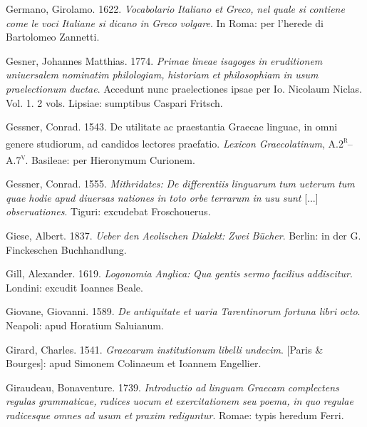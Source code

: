 Germano, Girolamo. 1622. \textit{Vocabolario} \textit{Italiano} \textit{et} \textit{Greco,} \textit{nel} \textit{quale} \textit{si} \textit{contiene} \textit{come} \textit{le} \textit{voci} \textit{Italiane} \textit{si} \textit{dicano} \textit{in} \textit{Greco} \textit{volgare}. In Roma: per l’herede di Bartolomeo Zannetti.

Gesner, Johannes Matthias. 1774. \textit{Primae} \textit{lineae} \textit{isagoges} \textit{in} \textit{eruditionem} \textit{uniuersalem} \textit{nominatim} \textit{philologiam,} \textit{historiam} \textit{et} \textit{philosophiam} \textit{in} \textit{usum} \textit{praelectionum} \textit{ductae}. Accedunt nunc praelectiones ipsae per Io. Nicolaum Niclas. Vol. 1. 2 vols. Lipsiae: sumptibus Caspari Fritsch.

Gessner, Conrad. 1543. De utilitate ac praestantia Graecae linguae, in omni genere studiorum, ad candidos lectores praefatio. \textit{Lexicon} \textit{Graecolatinum}, A.2\textsc{\textsuperscript{r}}–A.7\textsc{\textsuperscript{v}}. Basileae: per Hieronymum Curionem.

Gessner, Conrad. 1555. \textit{Mithridates:} \textit{De} \textit{differentiis} \textit{linguarum} \textit{tum} \textit{ueterum} \textit{tum} \textit{quae} \textit{hodie} \textit{apud} \textit{diuersas} \textit{nationes} \textit{in} \textit{toto} \textit{orbe} \textit{terrarum} \textit{in} \textit{usu} \textit{sunt} [...] \textit{obseruationes}. Tiguri: excudebat Froschouerus.

Giese, Albert. 1837. \textit{Ueber} \textit{den} \textit{Aeolischen} \textit{Dialekt:} \textit{Zwei} \textit{Bücher}. Berlin: in der G. Finckeschen Buchhandlung.

Gill, Alexander. 1619. \textit{Logonomia} \textit{Anglica:} \textit{Qua} \textit{gentis} \textit{sermo} \textit{facilius} \textit{addiscitur}. Londini: excudit Ioannes Beale.

Giovane, Giovanni. 1589. \textit{De} \textit{antiquitate} \textit{et} \textit{uaria} \textit{Tarentinorum} \textit{fortuna} \textit{libri} \textit{octo}. Neapoli: apud Horatium Saluianum.

Girard, Charles. 1541. \textit{Graecarum} \textit{institutionum} \textit{libelli} \textit{undecim}. [Paris \& Bourges]: apud Simonem Colinaeum et Ioannem Engellier.

Giraudeau, Bonaventure. 1739. \textit{Introductio} \textit{ad} \textit{linguam} \textit{Graecam} \textit{complectens} \textit{regulas} \textit{grammaticae,} \textit{radices} \textit{uocum} \textit{et} \textit{exercitationem} \textit{seu} \textit{poema,} \textit{in} \textit{quo} \textit{regulae} \textit{radicesque} \textit{omnes} \textit{ad} \textit{usum} \textit{et} \textit{praxim} \textit{rediguntur}. Romae: typis heredum Ferri.

